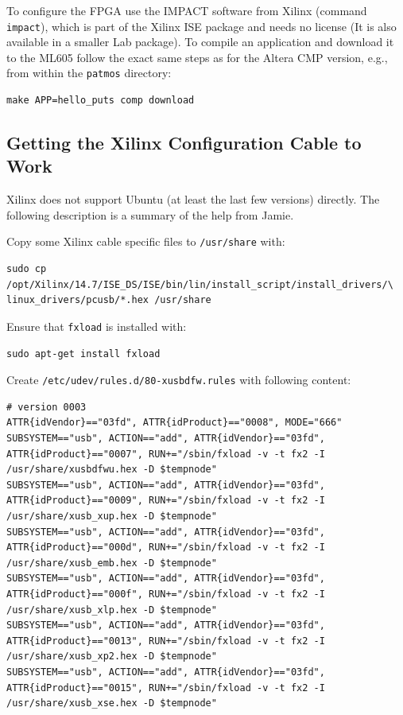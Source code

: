 \documentclass[a4paper,fontsize=10pt,twoside,DIV15,BCOR12mm,headinclude=true,footinclude=false,pagesize,bibtotoc]{scrbook}
\newcommand{\code}[1]{{\texttt{#1}}}
\begin{document}
To configure the FPGA use the IMPACT software from Xilinx (command \code{impact}), which is part of the Xilinx ISE package
and needs no license (It is also available in a smaller Lab package). To compile an application and
download it to the ML605 follow the exact same steps as for the Altera CMP version, e.g., from
within the \code{patmos} directory:

\begin{verbatim}
make APP=hello_puts comp download
\end{verbatim}

\subsection{Getting the Xilinx Configuration Cable to Work}

Xilinx does not support Ubuntu (at least the last few versions) directly. The following description
is a summary of the help from Jamie.

Copy some Xilinx cable specific files to \code{/usr/share} with:

\begin{verbatim}
sudo cp /opt/Xilinx/14.7/ISE_DS/ISE/bin/lin/install_script/install_drivers/\
linux_drivers/pcusb/*.hex /usr/share
\end{verbatim}
 
Ensure that \code{fxload} is installed with:
\begin{verbatim} 
sudo apt-get install fxload
\end{verbatim}

Create \code{/etc/udev/rules.d/80-xusbdfw.rules} with following content:

\begin{tiny}
\begin{verbatim}
# version 0003
ATTR{idVendor}=="03fd", ATTR{idProduct}=="0008", MODE="666"
SUBSYSTEM=="usb", ACTION=="add", ATTR{idVendor}=="03fd", ATTR{idProduct}=="0007", RUN+="/sbin/fxload -v -t fx2 -I /usr/share/xusbdfwu.hex -D $tempnode"
SUBSYSTEM=="usb", ACTION=="add", ATTR{idVendor}=="03fd", ATTR{idProduct}=="0009", RUN+="/sbin/fxload -v -t fx2 -I /usr/share/xusb_xup.hex -D $tempnode"
SUBSYSTEM=="usb", ACTION=="add", ATTR{idVendor}=="03fd", ATTR{idProduct}=="000d", RUN+="/sbin/fxload -v -t fx2 -I /usr/share/xusb_emb.hex -D $tempnode"
SUBSYSTEM=="usb", ACTION=="add", ATTR{idVendor}=="03fd", ATTR{idProduct}=="000f", RUN+="/sbin/fxload -v -t fx2 -I /usr/share/xusb_xlp.hex -D $tempnode"
SUBSYSTEM=="usb", ACTION=="add", ATTR{idVendor}=="03fd", ATTR{idProduct}=="0013", RUN+="/sbin/fxload -v -t fx2 -I /usr/share/xusb_xp2.hex -D $tempnode"
SUBSYSTEM=="usb", ACTION=="add", ATTR{idVendor}=="03fd", ATTR{idProduct}=="0015", RUN+="/sbin/fxload -v -t fx2 -I /usr/share/xusb_xse.hex -D $tempnode"
\end{verbatim}
\end{tiny}
\end{document}
